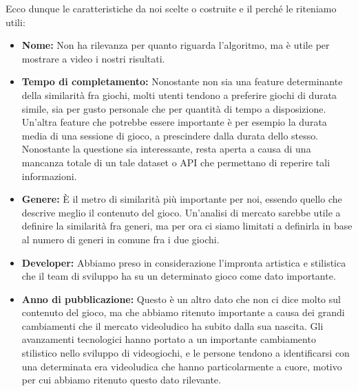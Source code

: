             Ecco dunque le caratteristiche da noi scelte o costruite e il perché le riteniamo utili:
            \begin{itemize}
                \item \textbf{Nome:} Non ha rilevanza per quanto riguarda l'algoritmo, ma è utile per mostrare a video i nostri risultati.
                
                \item \textbf{Tempo di completamento:} Nonostante non sia una feature determinante della similarità fra giochi, molti utenti tendono a preferire giochi di durata simile, sia per gusto personale che per quantità di tempo a disposizione. Un'altra feature che potrebbe essere importante è per esempio la durata media di una sessione di gioco, a prescindere dalla durata dello stesso. Nonostante la questione sia interessante, resta aperta a causa di una mancanza totale di un tale dataset o API che permettano di reperire tali informazioni.
                
                \item \textbf{Genere:} È il metro di similarità più importante per noi, essendo quello che descrive meglio il contenuto del gioco. Un'analisi di mercato sarebbe utile a definire la similarità fra generi, ma per ora ci siamo limitati a definirla in base al numero di generi in comune fra i due giochi.
                
                \item \textbf{Developer:} Abbiamo preso in considerazione l'impronta artistica e stilistica che il team di sviluppo ha su un determinato gioco come dato importante.
                
                \item \textbf{Anno di pubblicazione:} Questo è un altro dato che non ci dice molto sul contenuto del gioco, ma che abbiamo ritenuto importante a causa dei grandi cambiamenti che il mercato videoludico ha subito dalla sua nascita. Gli avanzamenti tecnologici hanno portato a un importante cambiamento stilistico nello sviluppo di videogiochi, e le persone tendono a identificarsi con una determinata era videoludica che hanno particolarmente a cuore, motivo per cui abbiamo ritenuto questo dato rilevante.
            \end{itemize}
            
